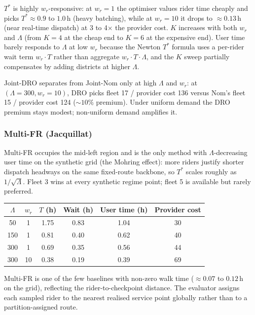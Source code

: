 $T^*$ is highly $w_r$-responsive: at $w_r{=}1$ the optimiser values rider time cheaply and picks $T^* \approx 0.9$ to $1.0$\,h (heavy batching), while at $w_r{=}10$ it drops to $\approx 0.13$\,h (near real-time dispatch) at 3 to 4$\times$ the provider cost. $K$ increases with both $w_r$ and $\Lambda$ (from $K{=}4$ at the cheap end to $K{=}6$ at the expensive end). User time barely responds to $\Lambda$ at low $w_r$ because the Newton $T^*$ formula uses a per-rider wait term $w_r \cdot T$ rather than aggregate $w_r \cdot T \cdot \Lambda$, and the $K$ sweep partially compensates by adding districts at higher $\Lambda$.

Joint-DRO separates from Joint-Nom only at high $\Lambda$ and $w_r$: at $(\Lambda{=}300, w_r{=}10)$, DRO picks fleet 17 / provider cost 136 versus Nom's fleet 15 / provider cost 124 ($\sim 10\%$ premium). Under uniform demand the DRO premium stays modest; non-uniform demand amplifies it.

\subsubsection{Multi-FR (Jacquillat)}

Multi-FR occupies the mid-left region and is the only method with $\Lambda$-decreasing user time on the synthetic grid (the Mohring effect): more riders justify shorter dispatch headways on the same fixed-route backbone, so $T^*$ scales roughly as $1/\sqrt{\Lambda}$. Fleet 3 wins at every synthetic regime point; fleet 5 is available but rarely preferred.

\begin{center}
\small
\begin{tabular}{cccccc}
\toprule
$\Lambda$ & $w_r$ & $T$ (h) & Wait (h) & User time (h) & Provider cost \\
\midrule
 50 &  1 & 1.75 & 0.83 & 1.04 & 30 \\
150 &  1 & 0.81 & 0.40 & 0.62 & 40 \\
300 &  1 & 0.69 & 0.35 & 0.56 & 44 \\
300 & 10 & 0.38 & 0.19 & 0.39 & 69 \\
\bottomrule
\end{tabular}
\end{center}

Multi-FR is one of the few baselines with non-zero walk time ($\approx 0.07$ to $0.12$\,h on the grid), reflecting the rider-to-checkpoint distance. The evaluator assigns each sampled rider to the nearest realised service point globally rather than to a partition-assigned route.

